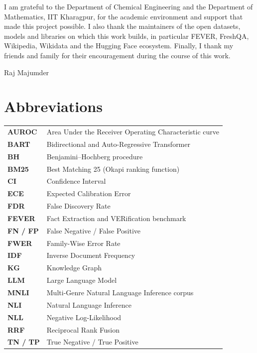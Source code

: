 \documentclass[12pt,a4paper,oneside]{report}
\newcommand{\StudentName}{Raj Majumder}
\newcommand{\StudentDept}{Chemical Engineering}
\theoremstyle{plain}
\theoremstyle{definition}
\theoremstyle{remark}
\begin{document}
I am grateful to the Department of \StudentDept{} and the Department of Mathematics, IIT Kharagpur, for the academic environment and support that made this project possible. I also thank the maintainers of the open datasets, models and libraries on which this work builds, in particular FEVER, FreshQA, Wikipedia, Wikidata and the Hugging Face ecosystem. Finally, I thank my friends and family for their encouragement during the course of this work.

\vspace{2cm}
\hfill \StudentName

\clearpage
{\setlength{\parskip}{0pt}%
\tableofcontents
\clearpage
{}
\listoffigures
\clearpage
{}
\listoftables}

\chapter*{Abbreviations}
\thispagestyle{plain}
\begin{tabular}{@{}p{}p{}}
\textbf{AUROC} & Area Under the Receiver Operating Characteristic curve\\
\textbf{BART} & Bidirectional and Auto-Regressive Transformer\\
\textbf{BH} & Benjamini--Hochberg procedure\\
\textbf{BM25} & Best Matching 25 (Okapi ranking function)\\
\textbf{CI} & Confidence Interval\\
\textbf{ECE} & Expected Calibration Error\\
\textbf{FDR} & False Discovery Rate\\
\textbf{FEVER} & Fact Extraction and VERification benchmark\\
\textbf{FN / FP} & False Negative / False Positive\\
\textbf{FWER} & Family-Wise Error Rate\\
\textbf{IDF} & Inverse Document Frequency\\
\textbf{KG} & Knowledge Graph\\
\textbf{LLM} & Large Language Model\\
\textbf{MNLI} & Multi-Genre Natural Language Inference corpus\\
\textbf{NLI} & Natural Language Inference\\
\textbf{NLL} & Negative Log-Likelihood\\
\textbf{RRF} & Reciprocal Rank Fusion\\
\textbf{TN / TP} & True Negative / True Positive\\
\end{tabular}
\end{document}
